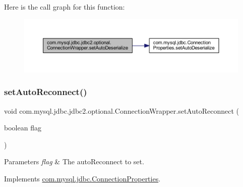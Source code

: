 Here is the call graph for this function\+:
\nopagebreak
\begin{figure}[H]
\begin{center}
\leavevmode
\includegraphics[width=350pt]{classcom_1_1mysql_1_1jdbc_1_1jdbc2_1_1optional_1_1_connection_wrapper_a4726b80bc80ed09e01a1e2be6e6fee84_cgraph}
\end{center}
\end{figure}
\mbox{\label{classcom_1_1mysql_1_1jdbc_1_1jdbc2_1_1optional_1_1_connection_wrapper_ab60e87c0bf38561dcfae0c6a3524ef27}} 
\subsubsection{\texorpdfstring{set\+Auto\+Reconnect()}{setAutoReconnect()}}
{\footnotesize\ttfamily void com.\+mysql.\+jdbc.\+jdbc2.\+optional.\+Connection\+Wrapper.\+set\+Auto\+Reconnect (\begin{DoxyParamCaption}\item[{boolean}]{flag }\end{DoxyParamCaption})}


\begin{DoxyParams}{Parameters}
{\em flag} & The auto\+Reconnect to set. \\
\hline
\end{DoxyParams}


Implements \mbox{\hyperlink{interfacecom_1_1mysql_1_1jdbc_1_1_connection_properties_aee554c71f65458593f28c1e7d79846d1}{com.\+mysql.\+jdbc.\+Connection\+Properties}}.

